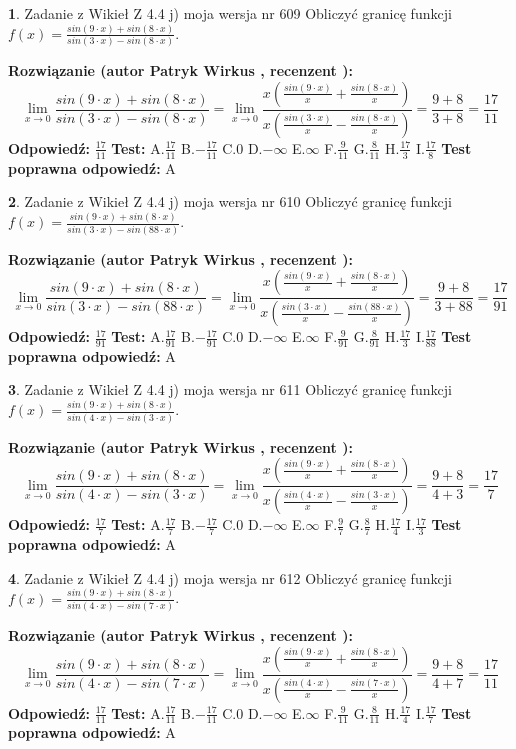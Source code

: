 \documentclass[12pt, a4paper]{article}
\theoremstyle{definition} %
\newtheorem{zad}{}
\newcommand{\zadStart}[1]{\begin{zad}#1\newline}
\newcommand{\zadStop}{\end{zad}}
\newcommand{\rozwStart}[2]{\noindent \textbf{Rozwiązanie (autor #1 , recenzent #2): }\newline}
\newcommand{\rozwStop}{\newline}
\newcommand{\odpStart}{\noindent \textbf{Odpowiedź:}\newline}
\newcommand{\odpStop}{\newline}
\newcommand{\testStart}{\noindent \textbf{Test:}\newline}
\newcommand{\testStop}{\newline}
\newcommand{\kluczStart}{\noindent \textbf{Test poprawna odpowiedź:}\newline}
\newcommand{\kluczStop}{\newline}
\begin{document}
\zadStart{Zadanie z Wikieł Z 4.4 j) moja wersja nr 609}
Obliczyć granicę funkcji $f(x)=\frac{sin(9\cdot x) +sin(8\cdot x)}{sin(3\cdot x) -sin(8\cdot x)}$.
\zadStop
\rozwStart{Patryk Wirkus}{}
$$\lim\limits_{x\to 0}\frac{sin(9\cdot x) +sin(8\cdot x)}{sin(3\cdot x) -sin(8\cdot x)}=\lim\limits_{x\to 0}\frac{x(\frac{sin(9\cdot x)}{x}+\frac{sin(8\cdot x)}{x})}{x(\frac{sin(3\cdot x)}{x}-\frac{sin(8\cdot x)}{x})}=\frac{9+8}{3+8} = \frac{17}{11}$$
\rozwStop
\odpStart
$\frac{17}{11}$
\odpStop
\testStart
A.$\frac{17}{11}$
B.$-\frac{17}{11}$
C.$0$
D.$-\infty$
E.$\infty$
F.$\frac{9}{11}$
G.$\frac{8}{11}$
H.$\frac{17}{3}$
I.$\frac{17}{8}$
\testStop
\kluczStart
A
\kluczStop



\zadStart{Zadanie z Wikieł Z 4.4 j) moja wersja nr 610}
Obliczyć granicę funkcji $f(x)=\frac{sin(9\cdot x) +sin(8\cdot x)}{sin(3\cdot x) -sin(88\cdot x)}$.
\zadStop
\rozwStart{Patryk Wirkus}{}
$$\lim\limits_{x\to 0}\frac{sin(9\cdot x) +sin(8\cdot x)}{sin(3\cdot x) -sin(88\cdot x)}=\lim\limits_{x\to 0}\frac{x(\frac{sin(9\cdot x)}{x}+\frac{sin(8\cdot x)}{x})}{x(\frac{sin(3\cdot x)}{x}-\frac{sin(88\cdot x)}{x})}=\frac{9+8}{3+88} = \frac{17}{91}$$
\rozwStop
\odpStart
$\frac{17}{91}$
\odpStop
\testStart
A.$\frac{17}{91}$
B.$-\frac{17}{91}$
C.$0$
D.$-\infty$
E.$\infty$
F.$\frac{9}{91}$
G.$\frac{8}{91}$
H.$\frac{17}{3}$
I.$\frac{17}{88}$
\testStop
\kluczStart
A
\kluczStop



\zadStart{Zadanie z Wikieł Z 4.4 j) moja wersja nr 611}
Obliczyć granicę funkcji $f(x)=\frac{sin(9\cdot x) +sin(8\cdot x)}{sin(4\cdot x) -sin(3\cdot x)}$.
\zadStop
\rozwStart{Patryk Wirkus}{}
$$\lim\limits_{x\to 0}\frac{sin(9\cdot x) +sin(8\cdot x)}{sin(4\cdot x) -sin(3\cdot x)}=\lim\limits_{x\to 0}\frac{x(\frac{sin(9\cdot x)}{x}+\frac{sin(8\cdot x)}{x})}{x(\frac{sin(4\cdot x)}{x}-\frac{sin(3\cdot x)}{x})}=\frac{9+8}{4+3} = \frac{17}{7}$$
\rozwStop
\odpStart
$\frac{17}{7}$
\odpStop
\testStart
A.$\frac{17}{7}$
B.$-\frac{17}{7}$
C.$0$
D.$-\infty$
E.$\infty$
F.$\frac{9}{7}$
G.$\frac{8}{7}$
H.$\frac{17}{4}$
I.$\frac{17}{3}$
\testStop
\kluczStart
A
\kluczStop



\zadStart{Zadanie z Wikieł Z 4.4 j) moja wersja nr 612}
Obliczyć granicę funkcji $f(x)=\frac{sin(9\cdot x) +sin(8\cdot x)}{sin(4\cdot x) -sin(7\cdot x)}$.
\zadStop
\rozwStart{Patryk Wirkus}{}
$$\lim\limits_{x\to 0}\frac{sin(9\cdot x) +sin(8\cdot x)}{sin(4\cdot x) -sin(7\cdot x)}=\lim\limits_{x\to 0}\frac{x(\frac{sin(9\cdot x)}{x}+\frac{sin(8\cdot x)}{x})}{x(\frac{sin(4\cdot x)}{x}-\frac{sin(7\cdot x)}{x})}=\frac{9+8}{4+7} = \frac{17}{11}$$
\rozwStop
\odpStart
$\frac{17}{11}$
\odpStop
\testStart
A.$\frac{17}{11}$
B.$-\frac{17}{11}$
C.$0$
D.$-\infty$
E.$\infty$
F.$\frac{9}{11}$
G.$\frac{8}{11}$
H.$\frac{17}{4}$
I.$\frac{17}{7}$
\testStop
\kluczStart
A
\kluczStop
\end{document}
